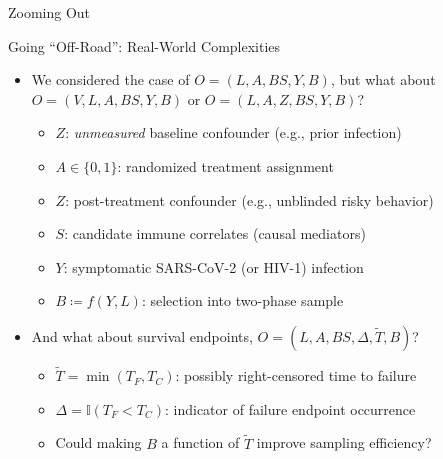 \documentclass{beamer}
\begin{document}

\begin{frame}[standout]
  Zooming Out
\end{frame}


\begin{frame}[c]{Going ``Off-Road'': Real-World Complexities}

\begin{center}
\begin{itemize}
  \itemsep8pt
  \item We considered the case of $O = (L, A, BS, Y, B)$, but what about $O =
    (V, L, A, BS, Y, B)$ or $O = (L, A, Z, BS, Y, B)$?
    \begin{itemize}
      \item $Z$: \textit{unmeasured} baseline confounder (e.g., prior
        infection)
      \item $A \in \{0, 1\}$: randomized treatment assignment
      \item $Z$: post-treatment confounder (e.g., unblinded risky
        behavior)
      \item $S$: candidate immune correlates (causal mediators)
      \item $Y$: symptomatic SARS-CoV-2 (or HIV-1) infection
      \item $B \coloneqq f(Y, L)$: selection into two-phase sample
    \end{itemize}
  \item And what about survival endpoints, $O = (L, A, BS, \Delta,
    \widetilde{T}, B)$?
    \begin{itemize}
      \item $\widetilde{T} = \min(T_F, T_C)$: possibly right-censored time
        to failure
      \item $\Delta = \mathbb{I}(T_F < T_C)$: indicator of failure
        endpoint occurrence
      \item Could making $B$ a function of $\widetilde{T}$ improve sampling
        efficiency?
    \end{itemize}
\end{itemize}
\end{center}


\end{frame}
\end{document}
